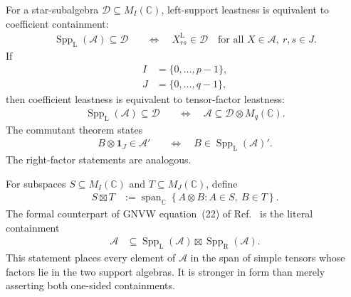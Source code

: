 \documentclass[11pt]{article}
\begin{document}
For a star-subalgebra $\mathcal D\subseteq M_I(\mathbb C)$, left-support
leastness is equivalent to coefficient containment:
\begin{align}
    \operatorname{Spp}_{\mathrm L}(\mathcal A)
    \subseteq\mathcal D
    \quad&\Longleftrightarrow\quad
    X^{\mathrm L}_{rs}\in\mathcal D
    \quad
    \text{for all }X\in\mathcal A,\ r,s\in J.
    \label{eq:gnvw12_support_algebra_full_matrix_scope_coefficient_leastness}
\end{align}
If
\begin{align}
    I
    &=\{0,\ldots,p-1\},
    \label{eq:gnvw12_support_algebra_full_matrix_scope_left_finset}\\
    J
    &=\{0,\ldots,q-1\},
    \label{eq:gnvw12_support_algebra_full_matrix_scope_right_finset}
\end{align}
then coefficient leastness is equivalent to tensor-factor leastness:
\begin{align}
    \operatorname{Spp}_{\mathrm L}(\mathcal A)
    \subseteq\mathcal D
    \quad&\Longleftrightarrow\quad
    \mathcal A\subseteq\mathcal D\otimes M_q(\mathbb C).
    \label{eq:gnvw12_support_algebra_full_matrix_scope_tensor_leastness}
\end{align}
The commutant theorem states
\begin{align}
    B\otimes\mathbf{1}_J\in\mathcal A'
    \quad&\Longleftrightarrow\quad
    B\in\operatorname{Spp}_{\mathrm L}(\mathcal A)'.
    \label{eq:gnvw12_support_algebra_full_matrix_scope_matrix_commutant}
\end{align}
The right-factor statements are analogous.

For subspaces $S\subseteq M_I(\mathbb C)$ and
$T\subseteq M_J(\mathbb C)$, define
\begin{align}
    S\boxtimes T
    &:=\operatorname{span}_{\mathbb C}
      \left\{A\otimes B:
      A\in S,\ B\in T\right\}.
    \label{eq:gnvw12_support_algebra_full_matrix_scope_boxtimes}
\end{align}
The formal counterpart of GNVW equation~(22) of Ref.~\cite{Gross2012IndexTheory} is the literal containment
\begin{align}
    \mathcal A
    &\subseteq
      \operatorname{Spp}_{\mathrm L}(\mathcal A)
      \boxtimes
      \operatorname{Spp}_{\mathrm R}(\mathcal A).
    \label{eq:gnvw12_support_algebra_full_matrix_scope_matrix_two_factor}
\end{align}
This statement places every element of $\mathcal A$ in the span of simple
tensors whose factors lie in the two support algebras. It is stronger in form
than merely asserting both one-sided containments.
\end{document}
